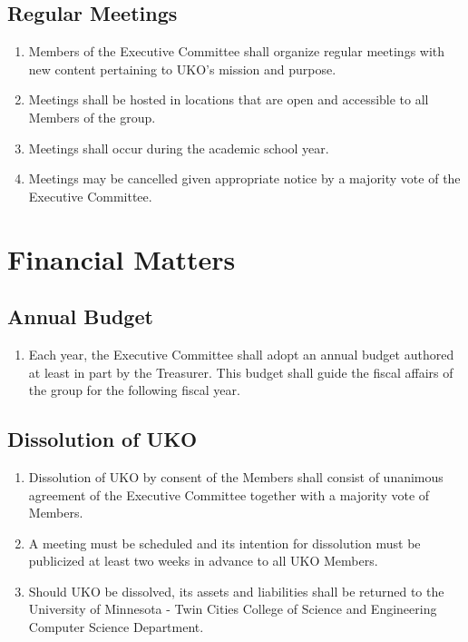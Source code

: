 \documentclass[12pt,executivepaper]{article}
\begin{document}
\subsection{Regular Meetings}
\begin{enumerate}
    \item Members of the Executive Committee shall organize regular meetings
          with new content pertaining to UKO's mission and purpose.
    \item Meetings shall be hosted in locations that are open and accessible
          to all Members of the group.
    \item Meetings shall occur during the academic school year.
    \item Meetings may be cancelled given appropriate notice by a majority
          vote of the Executive Committee.
\end{enumerate}

\section{Financial Matters}

\subsection{Annual Budget}
\begin{enumerate}
    \item Each year, the Executive Committee shall adopt an annual budget
          authored at least in part by the Treasurer. This budget shall guide
          the fiscal affairs of the group for the following fiscal year.
\end{enumerate}

\subsection{Dissolution of UKO}
\begin{enumerate}
    \item Dissolution of UKO by consent of the Members shall consist of
          unanimous agreement of the Executive Committee together with a
          majority vote of Members.
    \item A meeting must be scheduled and its intention for dissolution must
          be publicized at least two weeks in advance to all UKO Members.
    \item Should UKO be dissolved, its assets and liabilities shall be
          returned to the University of Minnesota - Twin Cities College of
          Science and Engineering Computer Science Department.
\end{enumerate}
\end{document}

